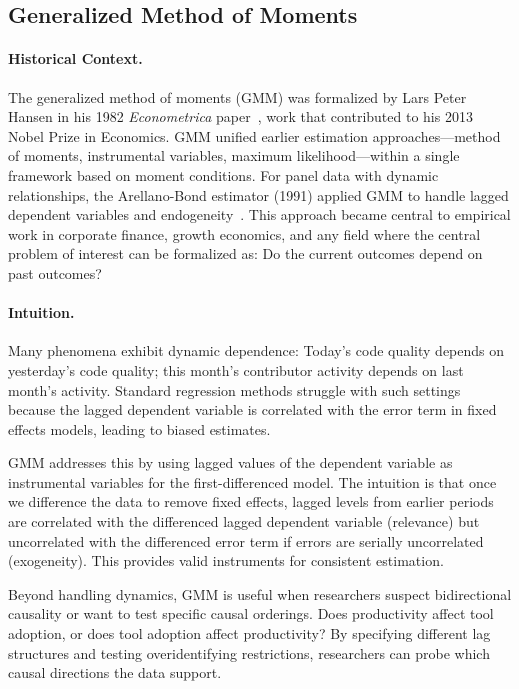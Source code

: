 \subsection{Generalized Method of Moments}

\paragraph{Historical Context.}
The generalized method of moments (GMM) was formalized by Lars Peter Hansen in his 1982 \emph{Econometrica} paper~\cite{hansen1982large}, work that contributed to his 2013 Nobel Prize in Economics.
GMM unified earlier estimation approaches---method of moments, instrumental variables, maximum likelihood---within a single framework based on moment conditions.
For panel data with dynamic relationships, the Arellano-Bond estimator (1991) applied GMM to handle lagged dependent variables and endogeneity~\cite{arellano1991some}.
This approach became central to empirical work in corporate finance, growth economics, and any field where the central problem of interest can be formalized as: Do the current outcomes depend on past outcomes?

\paragraph{Intuition.}
Many phenomena exhibit dynamic dependence: Today's code quality depends on yesterday's code quality; this month's contributor activity depends on last month's activity.
Standard regression methods struggle with such settings because the lagged dependent variable is correlated with the error term in fixed effects models, leading to biased estimates.

GMM addresses this by using lagged values of the dependent variable as instrumental variables for the first-differenced model.
The intuition is that once we difference the data to remove fixed effects, lagged levels from earlier periods are correlated with the differenced lagged dependent variable (relevance) but uncorrelated with the differenced error term if errors are serially uncorrelated (exogeneity).
This provides valid instruments for consistent estimation.

Beyond handling dynamics, GMM is useful when researchers suspect bidirectional causality or want to test specific causal orderings.
Does productivity affect tool adoption, or does tool adoption affect productivity?
By specifying different lag structures and testing overidentifying restrictions, researchers can probe which causal directions the data support.

